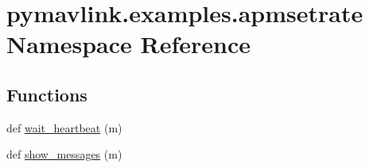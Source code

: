 \hypertarget{namespacepymavlink_1_1examples_1_1apmsetrate}{}\section{pymavlink.\+examples.\+apmsetrate Namespace Reference}
\label{namespacepymavlink_1_1examples_1_1apmsetrate}
\subsection*{Functions}
\begin{DoxyCompactItemize}
\item 
def \hyperlink{namespacepymavlink_1_1examples_1_1apmsetrate_a7411701774159f385cda1fd908922db8}{wait\+\_\+heartbeat} (m)
\item 
def \hyperlink{namespacepymavlink_1_1examples_1_1apmsetrate_a81e07c39f713646c60c7a22474c50b3f}{show\+\_\+messages} (m)
\end{DoxyCompactItemize}
